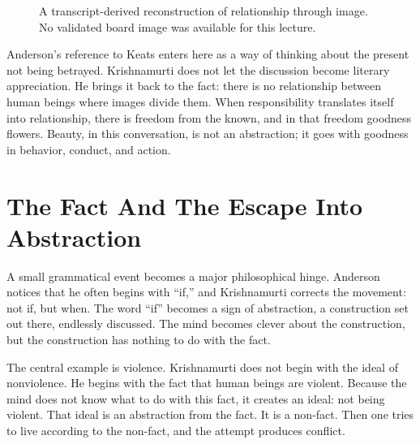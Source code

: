 \begin{figure}
\centering
{}
\caption{A transcript-derived reconstruction of relationship through image. No validated board image was available for this lecture.}
\end{figure}

Anderson's reference to Keats enters here as a way of thinking about the present not being betrayed. Krishnamurti does not let the discussion become literary appreciation. He brings it back to the fact: there is no relationship between human beings where images divide them. When responsibility translates itself into relationship, there is freedom from the known, and in that freedom goodness flowers. Beauty, in this conversation, is not an abstraction; it goes with goodness in behavior, conduct, and action.

\section{The Fact And The Escape Into Abstraction}

A small grammatical event becomes a major philosophical hinge. Anderson notices that he often begins with ``if,'' and Krishnamurti corrects the movement: not if, but when. The word ``if'' becomes a sign of abstraction, a construction set out there, endlessly discussed. The mind becomes clever about the construction, but the construction has nothing to do with the fact.

The central example is violence. Krishnamurti does not begin with the ideal of nonviolence. He begins with the fact that human beings are violent. Because the mind does not know what to do with this fact, it creates an ideal: not being violent. That ideal is an abstraction from the fact. It is a non-fact. Then one tries to live according to the non-fact, and the attempt produces conflict.

